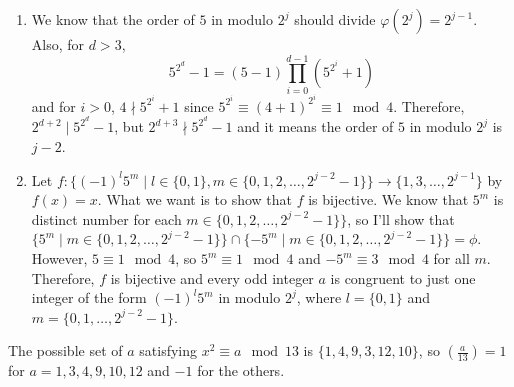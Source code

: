 \documentclass[12pt]{article}
\newenvironment{problem}[2][Problem]{\begin{trivlist}
\item[\hskip \labelsep {\bfseries #1}\hskip \labelsep {\bfseries #2.}]}{\end{trivlist}}
\begin{document}
\begin{problem}{5}
\begin{enumerate}
    \item[(a)] We know that the order of $5$ in modulo $2^j$ should divide $\varphi(2^j)=2^{j-1}$. Also, for $d>3$,
    \begin{equation*}
        5^{2^d}-1 = (5-1)\prod_{i=0}^{d-1} (5^{2^i}+1)
    \end{equation*}
    and for $i>0$, $4\nmid 5^{2^i}+1$ since $5^{2^i}\equiv (4+1)^{2^i}\equiv 1\mod 4$. Therefore, $2^{d+2}\mid 5^{2^d}-1$, but $2^{d+3}\nmid 5^{2^d}-1$ and it means the order of $5$ in modulo $2^j$ is $j-2$.
    \item[(b)] Let $f:\{(-1)^l5^m\mid l\in\{0,1\},m\in\{0,1,2,\ldots, 2^{j-2}-1\}\}\rightarrow \{1,3,\ldots, 2^{j-1}\}$ by $f(x)=x$. What we want is to show that $f$ is bijective. We know that $5^m$ is distinct number for each $m\in\{0,1,2,\ldots, 2^{j-2}-1\}\}$, so I'll show that $\{5^m\mid m\in\{0,1,2,\ldots, 2^{j-2}-1\}\}\cap \{-5^m\mid m\in\{0,1,2,\ldots, 2^{j-2}-1\}\}=\phi$. However, $5\equiv 1 \mod 4$, so $5^m\equiv 1\mod 4$ and $-5^m\equiv 3\mod 4$ for all $m$. Therefore, $f$ is bijective and every odd integer $a$ is congruent to just one integer of the form $(-1)^l5^m$ in modulo $2^j$, where $l = \{0, 1\}$ and $m = \{0, 1, \ldots , 2^{j-2}-1\}$.
\end{enumerate}
\end{problem}
\begin{problem}{6}
\end{problem}
The possible set of $a$ satisfying $x^2\equiv a\mod 13$ is $\{1,4,9,3,12,10\}$, so $\left(\frac{a}{13}\right)=1$ for $a=1,3,4,9,10,12$ and $-1$ for the others.
\end{document}
